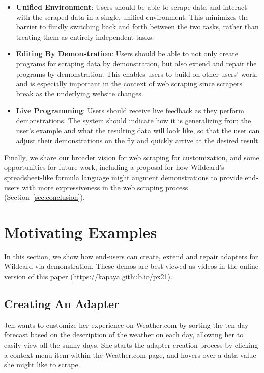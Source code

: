 \documentclass[sigconf,10pt]{acmart}
\providecommand{\tightlist}{%
  \setlength{\itemsep}{0pt}\setlength{\parskip}{0pt}}
\begin{document}
\begin{itemize}
\tightlist
\item
  \textbf{Unified Environment}: Users should be able to scrape data and
  interact with the scraped data in a single, unified environment. This
  minimizes the barrier to fluidly switching back and forth between the
  two tasks, rather than treating them as entirely independent tasks.
\item
  \textbf{Editing By Demonstration}: Users should be able to not only
  create programs for scraping data by demonstration, but also extend
  and repair the programs by demonstration. This enables users to build
  on other users' work, and is especially important in the context of
  web scraping since scrapers break as the underlying website changes.
\item
  \textbf{Live Programming}: Users should receive live feedback as they
  perform demonstrations. The system should indicate how it is
  generalizing from the user's example and what the resulting data will
  look like, so that the user can adjust their demonstrations on the fly
  and quickly arrive at the desired result.
\end{itemize}

Finally, we share our broader vision for web scraping for customization,
and some opportunities for future work, including a proposal for how
Wildcard's spreadsheet-like formula language might augment
demonstrations to provide end-users with more expressiveness in the web
scraping process (Section~\ref{sec:conclusion}).

\hypertarget{sec:demos}{%
\section{Motivating Examples}\label{sec:demos}}

In this section, we show how end-users can create, extend and repair
adapters for Wildcard via demonstration.{ These demos are best viewed as
videos in the online version of this paper
(\url{https://kapaya.github.io/px21}).}

\hypertarget{creating-an-adapter}{%
\subsection{Creating An Adapter}\label{creating-an-adapter}}

Jen wants to customize her experience on Weather.com by sorting the
ten-day forecast based on the description of the weather on each day,
allowing her to easily view all the sunny days. She starts the adapter
creation process by clicking a context menu item within the Weather.com
page, and hovers over a data value she might like to scrape.
\end{document}
